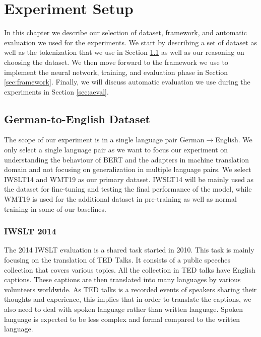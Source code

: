 
\chapter{Experiment Setup}
\label{chap:03}
In this chapter we describe our selection of dataset, framework, and automatic evaluation we used for the experiments. We start by describing a set of dataset as well as the tokenization that we use in Section \ref{sec:dataset} as well as our reasoning on choosing the dataset. We then move forward to the framework we use to implement the neural network, training, and evaluation phase in Section \ref{sec:framework}. Finally, we will discuss automatic evaluation we use during the experiments in Section \ref{sec:aeval}.

\section{German-to-English Dataset}
\label{sec:dataset}
The scope of our experiment is in a single language pair German$\rightarrow$English. We only select a single language pair as we want to focus our experiment on understanding the behaviour of BERT and the adapters in machine translation domain and not focusing on generalization in multiple language pairs. We select IWSLT14 and WMT19 as our primary dataset. IWSLT14 will be mainly used as the dataset for fine-tuning and testing the final performance of the model, while WMT19 is used for the additional dataset in pre-training as well as normal training in some of our baselines.

\subsection{IWSLT 2014}
The 2014 IWSLT evaluation \cite{Cettolo2014ReportOT} is a shared task started in 2010. This task is mainly focusing on the translation of TED Talks. It consists of a public speeches collection that covers various topics. All the collection in TED talks have English captions. These captions are then translated into many languages by various volunteers worldwide. As TED talks is a recorded events of speakers sharing their thoughts and experience, this implies that in order to translate the captions, we also need to deal with spoken language rather than written language. Spoken language is expected to be less complex and formal compared to the written language.


